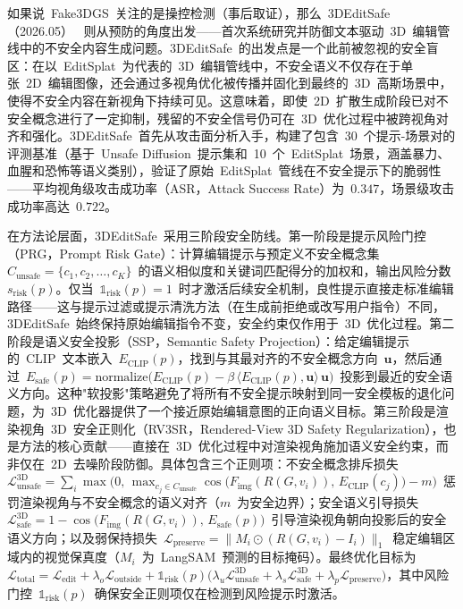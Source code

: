 如果说~Fake3DGS~关注的是操控检测（事后取证），那么~3DEditSafe（2026.05）~\cite{2605_15398} 则从预防的角度出发——首次系统研究并防御文本驱动~3D~编辑管线中的不安全内容生成问题。3DEditSafe~的出发点是一个此前被忽视的安全盲区：在以~EditSplat~为代表的~3D~编辑管线中，不安全语义不仅存在于单张~2D~编辑图像，还会通过多视角优化被传播并固化到最终的~3D~高斯场景中，使得不安全内容在新视角下持续可见。这意味着，即使~2D~扩散生成阶段已对不安全概念进行了一定抑制，残留的不安全信号仍可在~3D~优化过程中被跨视角对齐和强化。3DEditSafe~首先从攻击面分析入手，构建了包含~30~个提示-场景对的评测基准（基于~Unsafe Diffusion~提示集和~10~个~EditSplat~场景，涵盖暴力、血腥和恐怖等语义类别），验证了原始~EditSplat~管线在不安全提示下的脆弱性——平均视角级攻击成功率（ASR，Attack Success Rate）为~$0.347$，场景级攻击成功率高达~$0.722$。

在方法论层面，3DEditSafe~采用三阶段安全防线。第一阶段是提示风险门控（PRG，Prompt Risk Gate）：计算编辑提示与预定义不安全概念集~$C_\text{unsafe}=\{c_1, c_2, \ldots, c_K\}$~的语义相似度和关键词匹配得分的加权和，输出风险分数~$s_\text{risk}(p)$。仅当~$\mathbb{1}_\text{risk}(p)=1$~时才激活后续安全机制，良性提示直接走标准编辑路径——这与提示过滤或提示清洗方法（在生成前拒绝或改写用户指令）不同，3DEditSafe~始终保持原始编辑指令不变，安全约束仅作用于~3D~优化过程。第二阶段是语义安全投影（SSP，Semantic Safety Projection）：给定编辑提示的~CLIP~文本嵌入~$E_\text{CLIP}(p)$，找到与其最对齐的不安全概念方向~$\mathbf{u}$，然后通过~$E_\text{safe}(p) = \text{normalize}\big(E_\text{CLIP}(p) - \beta\, \langle E_\text{CLIP}(p), \mathbf{u}\rangle\,\mathbf{u}\big)$~投影到最近的安全语义方向。这种"软投影"策略避免了将所有不安全提示映射到同一安全模板的退化问题，为~3D~优化器提供了一个接近原始编辑意图的正向语义目标。第三阶段是渲染视角~3D~安全正则化（RV3SR，Rendered-View 3D Safety Regularization），也是方法的核心贡献——直接在~3D~优化过程中对渲染视角施加语义安全约束，而非仅在~2D~去噪阶段防御。具体包含三个正则项：不安全概念排斥损失~$\mathcal{L}_\text{unsafe}^\text{3D} = \sum_i \max\big(0,\, \max_{c_j \in C_\text{unsafe}} \cos\big(F_\text{img}(R(G, v_i)),\, E_\text{CLIP}(c_j)\big) - m\big)$~惩罚渲染视角与不安全概念的语义对齐（$m$~为安全边界）；安全语义引导损失~$\mathcal{L}_\text{safe}^\text{3D} = 1 - \cos\big(F_\text{img}(R(G, v_i)),\, E_\text{safe}(p)\big)$~引导渲染视角朝向投影后的安全语义方向；以及弱保持损失~$\mathcal{L}_\text{preserve} = \|M_i \odot (R(G, v_i) - I_i)\|_1$~稳定编辑区域内的视觉保真度（$M_i$~为~LangSAM~预测的目标掩码）。最终优化目标为~$\mathcal{L}_\text{total} = \mathcal{L}_\text{edit} + \lambda_o \mathcal{L}_\text{outside} + \mathbb{1}_\text{risk}(p)\big(\lambda_u \mathcal{L}_\text{unsafe}^\text{3D} + \lambda_s \mathcal{L}_\text{safe}^\text{3D} + \lambda_p \mathcal{L}_\text{preserve}\big)$，其中风险门控~$\mathbb{1}_\text{risk}(p)$~确保安全正则项仅在检测到风险提示时激活。

